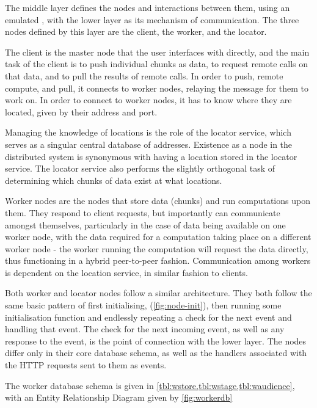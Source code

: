 The middle layer \chunknet defines the nodes and interactions between them, using an emulated , with the lower \orcv layer as its mechanism of communication.
The three nodes defined by this layer are the client, the worker, and the locator.

The client is the master node that the user interfaces with directly, and the main task of the client is to push individual chunks as data, to request remote calls on that data, and to pull the results of remote calls.
In order to push, remote compute, and pull, it connects to worker nodes, relaying the message for them to work on.
In order to connect to worker nodes, it has to know where they are located, given by their address and port.

Managing the knowledge of locations is the role of the locator service, which serves as a singular central database of addresses.
Existence as a node in the distributed system is synonymous with having a location stored in the locator service.
The locator service also performs the slightly orthogonal task of determining which chunks of data exist at what locations.

Worker nodes are the nodes that store data (chunks) and run computations upon them.
They respond to client requests, but importantly can communicate amongst themselves, particularly in the case of data being available on one worker node, with the data required for a computation taking place on a different worker node - the worker running the computation will request the data directly, thus functioning in a hybrid peer-to-peer fashion.
Communication among workers is dependent on the location service, in similar fashion to clients.

Both worker and locator nodes follow a similar architecture.
They both follow the same basic pattern of first initialising, (\cref{fig:node-init}), then running some initialisation function and endlessly repeating a check for the next event and handling that event.
The check for the next incoming event, as well as any response to the event, is the point of connection with the lower \orcv layer.
The nodes differ only in their core database schema, as well as the handlers associated with the HTTP requests sent to them as events.

The worker database schema is given in \cref{tbl:wstore,tbl:wstage,tbl:waudience}, with an Entity Relationship Diagram given by \cref{fig:workerdb}


